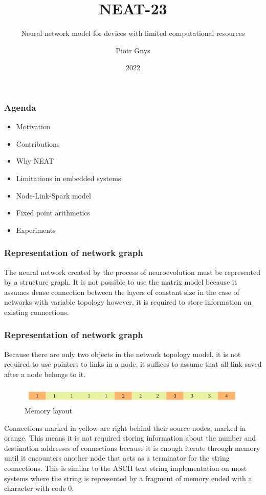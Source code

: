 \documentclass{beamer}
\title{NEAT-23}
\subtitle{Neural network model for devices with limited computational resources}
\author{Piotr Gnys}
\institute{Polish Japanese Academy of Information Technology}
\date{2022}
\begin{document}
\frame{\titlepage}

\begin{frame}
\frametitle{Agenda}
	\begin{itemize}
		\item Motivation
		\item Contributions
		\item Why NEAT
		\item Limitations in embedded systems
		\item Node-Link-Spark model
		\item Fixed point arithmetics
		\item Experiments
	\end{itemize}
\end{frame}

\begin{frame}
\frametitle{Representation of network graph}
	The neural network created by the process of neuroevolution must be represented by a structure
	graph.
	It is not possible to use the matrix model because it assumes dense connection between the 
	layers of constant size in the case of networks with variable topology however, it is required 
	to store information on existing connections.
\end{frame}

\begin{frame}
\frametitle{Representation of network graph}
	Because there are only two objects in the network topology model, it is not required
	to use pointers to links in a node, it suffices to assume that all link saved after a node 
	belongs to it.
	\begin{figure}[htb] 
		\includegraphics[width=\textwidth]{figures/in_memo}
		\caption{Memory layout}
	\end{figure}
	Connections marked in yellow are right behind their source nodes, marked in orange. 
	This means it is not required storing information about the number and destination addresses 
	of connections because it is enough iterate through memory until it encounters another node 
	that acts as a terminator for the string connections.
	This is similar to the ASCII text string implementation on most systems where the string is 
	represented by a fragment of memory ended with a character with code 0.
\end{frame}
\end{document}
